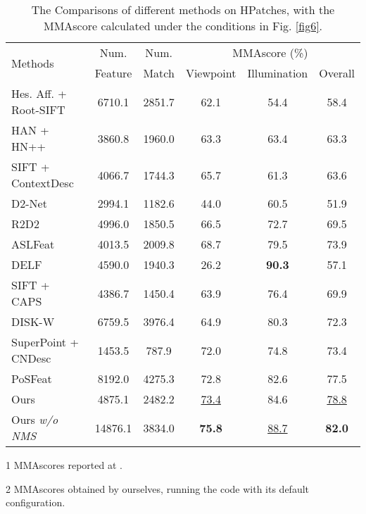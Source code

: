 \documentclass[journal]{IEEEtran}
\begin{document}
\begin{table*}[h]
\renewcommand\arraystretch{1.5}
\centering
\caption{The Comparisons of different methods on HPatches, with the MMAscore calculated under the conditions in Fig. \ref{fig6}.}
{
\begin{threeparttable}
\begin{tabular}{l|cc|ccc}
    \hline
    \multirow{2}{*}{Methods} & Num. & Num. & \multicolumn{3}{c}{MMAscore (\%)}\\
    \cline{4-6}
            & Feature & Match & Viewpoint & Illumination & Overall \\
    \hline
    \hline
    Hes. Aff. + Root-SIFT\tnote{1} \ \cite{HesAffandSIFT}  & 6710.1 & 2851.7 & 62.1 & 54.4 & 58.4 \\
    HAN \cite{HesAffNet} + HN++\tnote{1} \ \cite{HardNetpp}             & 3860.8 & 1960.0 & 63.3 & 63.4 & 63.3 \\
    SIFT + ContextDesc\tnote{1} \ \cite{ContextDesc}     & 4066.7 & 1744.3 & 65.7 & 61.3 & 63.6 \\
    D2-Net\tnote{1} \ \cite{D2net}                 & 2994.1 & 1182.6 & 44.0 & 60.5 & 51.9 \\
    R2D2\tnote{1} \ \cite{R2D2}                   & 4996.0 & 1850.5 & 66.5 & 72.7 & 69.5 \\
    ASLFeat\tnote{1} \ \cite{aslfeat}                & 4013.5 & 2009.8 & 68.7 & 79.5 & 73.9 \\
    DELF\tnote{1} \ \cite{DELF}                   & 4590.0 & 1940.3 & 26.2 & \textbf{90.3} & 57.1 \\
    SIFT + CAPS\tnote{1} \ \cite{caps}            & 4386.7 & 1450.4 & 63.9 & 76.4 & 69.9 \\
    DISK-W\tnote{1} \ \cite{disk}                 & 6759.5 & 3976.4 & 64.9 & 80.3 & 72.3 \\
    SuperPoint + CNDesc\tnote{2} \ \cite{cndesc} & 1453.5 & 787.9 & 72.0 & 74.8 & 73.4 \\
    PoSFeat\tnote{1} \ \cite{li2022decoupling}                 & 8192.0 & 4275.3 & 72.8 & 82.6 & 77.5 \\
\hdashline
Ours      & 4875.1 & 2482.2 & \underline{73.4} & 84.6 & \underline{78.8} \\
Ours \textit{w/o NMS}          & 14876.1 & 3834.0 & \textbf{75.8} & \underline{88.7} & \textbf{82.0} \\
    \hline
\end{tabular}
\begin{tablenotes}
\footnotesize
\item[1] MMAscores reported at \cite{li2022decoupling}.
\item[2] MMAscores obtained by ourselves, running the code with its default configuration.
\end{tablenotes}
\end{threeparttable}
}
\label{table1}
\end{table*}
\end{document}
